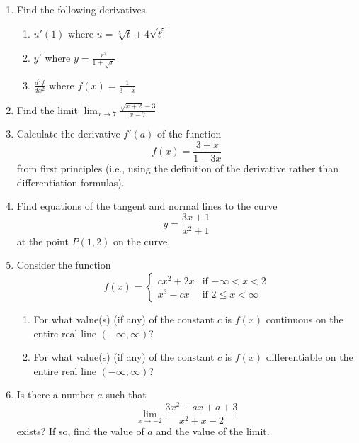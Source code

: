 \documentclass[12pt]{article}
\newcommand{\ds}{\displaystyle}
\begin{document}
\begin{enumerate}
\item Find the following derivatives.
  \begin{enumerate}
  \item $u'(1)$ where $\ds u=\sqrt[5]{t} + 4\sqrt{t^5}$
\vfill
  \item $y'$ where $\ds y=\frac{r^2}{1+\sqrt{r}}$
\vfill
\newpage
  \item $\ds \frac{d^2f}{dx^2}$
    where $\ds f(x)=\frac{1}{3-x}$
\vfill
  \end{enumerate}
\vfill
\item Find 
  the limit $\ds \lim_{x\to 7} \frac{\sqrt{x+2} - 3}{x-7}$
\vfill
\newpage
\item Calculate
  the derivative $f'(a)$ of the function 
  \begin{displaymath}
    f(x) = \frac{3+x}{1-3x}
  \end{displaymath}
  from first principles (i.e., using
  the definition of the derivative rather than differentiation formulas).
\newpage
\item Find
  equations of the tangent and normal lines to the curve
  \begin{displaymath}
    y = \frac{3x+1}{x^2+1}
  \end{displaymath}
  at the point $P(1,2)$ on the curve.
\newpage
\item Consider the function
  \begin{displaymath}
    f(x) = \begin{cases}
      cx^2 + 2x & \mbox{if $-\infty<x<2$} \\
      x^3 - cx  & \mbox{if $2\le x < \infty$}
    \end{cases}
  \end{displaymath}
  \begin{enumerate}
  \item For
    what value(s) (if any) of the constant $c$ is 
    $f(x)$ continuous on the entire
    real line $(-\infty,\infty)$?
  \vfill
  \item For
    what value(s) (if any) of the constant $c$ is 
    $f(x)$ differentiable on the entire
    real line $(-\infty,\infty)$?
  \vfill
  \end{enumerate}
\newpage
\item Is there a number $a$ such that
  \begin{displaymath}
    \lim_{x\to -2} \frac{3x^2+ax+a+3}{x^2+x-2}
  \end{displaymath}
  exists?  If so, find the value of $a$ and the value of the limit.
\end{enumerate}
\end{document}

